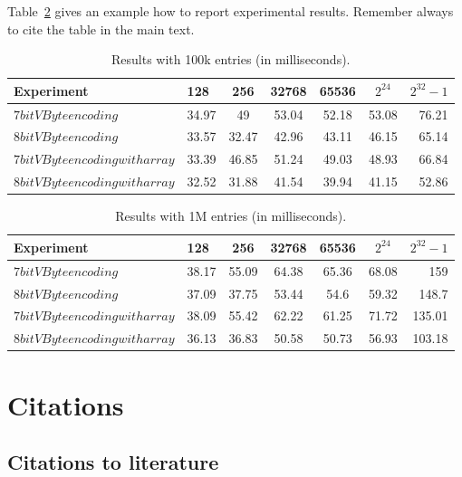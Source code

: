 Table~\ref{table:results} gives an example how to report experimental results. Remember always to cite the table in the main text. 

\begin{table}
\centering
\caption{Results with 100k entries (in milliseconds).\label{table:results}}
\begin{tabular}{l||l c c c c r} 
Experiment & 128 & 256 & 32768 & 65536 & $2^{24}$ & $2^{32} -1$\\ 
\hline \hline 
$7bit VByte encoding$ & 34.97 & 49 & 53.04 & 52.18 & 53.08 & 76.21\\
$8bit VByte encoding$ & 33.57 & 32.47 & 42.96 & 43.11 & 46.15 & 65.14\\
$7bit VByte encoding with array$ & 33.39 & 46.85 & 51.24 & 49.03 & 48.93 & 66.84 \\
$8bit VByte encoding with array$ & 32.52 & 31.88 & 41.54 & 39.94 & 41.15 & 52.86 \\

\hline
%
\end{tabular}
\end{table}

\begin{table}
\centering
\caption{Results with 1M entries (in milliseconds).\label{table:results}}
\begin{tabular}{l||l c c c c r} 
Experiment & 128 & 256 & 32768 & 65536 & $2^{24}$ & $2^{32} -1$ \\ 
\hline \hline 
$7bit VByte encoding$ & 38.17 & 55.09 & 64.38 & 65.36 & 68.08 & 159 \\
$8bit VByte encoding$ & 37.09 & 37.75 & 53.44 & 54.6 & 59.32 & 148.7\\
$7bit VByte encoding with array$ & 38.09 & 55.42 & 62.22 & 61.25 & 71.72 & 135.01\\
$8bit VByte encoding with array$ & 36.13 & 36.83 & 50.58 & 50.73 & 56.93 & 103.18\\

\hline
%
\end{tabular}
\end{table}

\chapter{Citations}

\section{Citations to literature}

